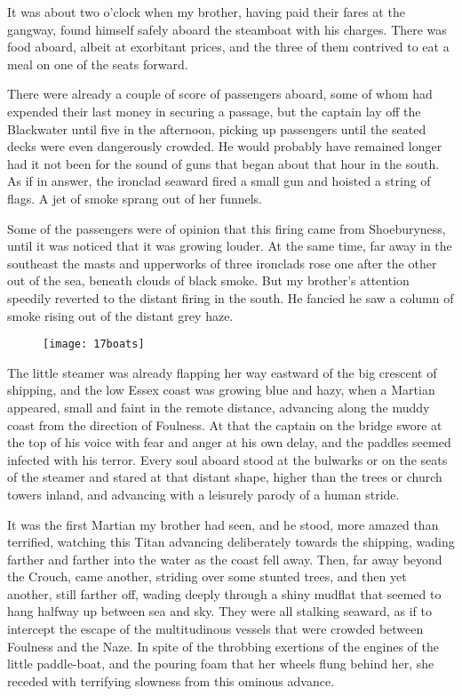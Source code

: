 It was about two o'clock when my brother, having paid their fares at the gangway, found himself safely aboard the steamboat with his charges. There was food aboard, albeit at exorbitant prices, and the three of them contrived to eat a meal on one of the seats forward.

There were already a couple of score of passengers aboard, some of whom had expended their last money in securing a passage, but the captain lay off the Blackwater until five in the afternoon, picking up passengers until the seated decks were even dangerously crowded. He would probably have remained longer had it not been for the sound of guns that began about that hour in the south. As if in answer, the ironclad seaward fired a small gun and hoisted a string of flags. A jet of smoke sprang out of her funnels.

Some of the passengers were of opinion that this firing came from Shoeburyness, until it was noticed that it was growing louder. At the same time, far away in the southeast the masts and upperworks of three ironclads rose one after the other out of the sea, beneath clouds of black smoke. But my brother's attention speedily reverted to the distant firing in the south. He fancied he saw a column of smoke rising out of the distant grey haze.

\begin{figure}[tb!]
\centering
\texttt{[image: 17boats]}
\end{figure}

The little steamer was already flapping her way eastward of the big crescent of shipping, and the low Essex coast was growing blue and hazy, when a Martian appeared, small and faint in the remote distance, advancing along the muddy coast from the direction of Foulness. At that the captain on the bridge swore at the top of his voice with fear and anger at his own delay, and the paddles seemed infected with his terror. Every soul aboard stood at the bulwarks or on the seats of the steamer and stared at that distant shape, higher than the trees or church towers inland, and advancing with a leisurely parody of a human stride.

It was the first Martian my brother had seen, and he stood, more amazed than terrified, watching this Titan advancing deliberately towards the shipping, wading farther and farther into the water as the coast fell away. Then, far away beyond the Crouch, came another, striding over some stunted trees, and then yet another, still farther off, wading deeply through a shiny mudflat that seemed to hang halfway up between sea and sky. They were all stalking seaward, as if to intercept the escape of the multitudinous vessels that were crowded between Foulness and the Naze. In spite of the throbbing exertions of the engines of the little paddle-boat, and the pouring foam that her wheels flung behind her, she receded with terrifying slowness from this ominous advance.

